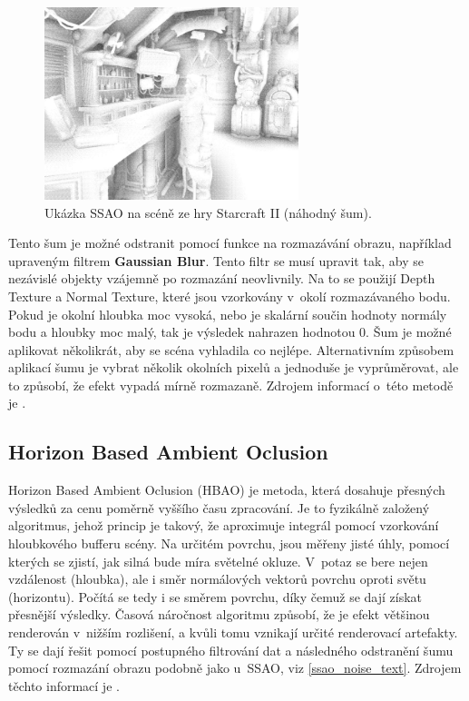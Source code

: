 \begin{figure}[H]
	\centering
	\includegraphics[width=20em]{images/ssao/noise.png}
	\caption[caption]{Ukázka SSAO na scéně ze hry Starcraft II (náhodný šum).\footnotemark} 
	\label{ssao_noise}
\end{figure}

\label{ssao_noise_text}Tento šum je možné odstranit pomocí funkce na rozmazávání obrazu, například upraveným filtrem \textbf{Gaussian Blur}. Tento filtr se musí upravit tak, aby se nezávislé objekty vzájemně po rozmazání neovlivnily. Na to se použijí Depth Texture a Normal Texture, které jsou vzorkovány v~okolí rozmazávaného bodu. Pokud je okolní hloubka moc vysoká, nebo je skalární součin hodnoty normály bodu a hloubky moc malý, tak je výsledek nahrazen hodnotou 0. Šum je možné aplikovat několikrát, aby se scéna vyhladila co nejlépe. Alternativním způsobem aplikací šumu je vybrat několik okolních pixelů a jednoduše je vyprůměrovat, ale to způsobí, že efekt vypadá mírně rozmazaně. Zdrojem informací o~této metodě je \cite{learnogl}.

\subsection*{Horizon Based Ambient Oclusion}
Horizon Based Ambient Oclusion (HBAO) je metoda, která dosahuje přesných výsledků za cenu poměrně vyššího času zpracování. Je to fyzikálně založený algoritmus, jehož princip je takový, že aproximuje integrál pomocí vzorkování hloubkového bufferu scény. Na určitém povrchu, jsou měřeny jisté úhly, pomocí kterých se zjistí, jak silná bude míra světelné okluze. V~potaz se bere nejen vzdálenost (hloubka), ale i směr normálových vektorů povrchu oproti světu (horizontu). Počítá se tedy i se směrem povrchu, díky čemuž se dají získat přesnější výsledky. Časová náročnost algoritmu způsobí, že je efekt většinou renderován v~nižším rozlišení, a kvůli tomu vznikají určité renderovací artefakty. Ty se dají řešit pomocí postupného filtrování dat a následného odstranění  šumu pomocí rozmazání obrazu podobně jako u~SSAO, viz \ref{ssao_noise_text}. Zdrojem těchto informací je \cite{hbao}.


